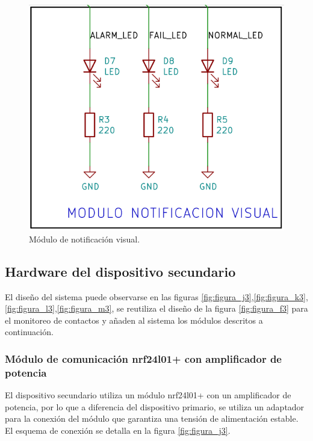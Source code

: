 \begin{figure}[]
	\centering
	\includegraphics[scale=.25]{./Figures/Capitulo3/Fig_H3.png}
	\caption{Módulo de notificación visual.}
	\label{fig:figura_h3}
\end{figure} 


\subsection{Hardware del dispositivo secundario}

El diseño del sistema puede observarse en las figuras \ref{fig:figura_j3},\ref{fig:figura_k3},\ref{fig:figura_l3},\ref{fig:figura_m3}, se reutiliza el diseño de la figura \ref{fig:figura_f3} para el monitoreo de contactos y añaden al sistema los módulos descritos a continuación.

\subsubsection{Módulo de comunicación nrf24l01+ con amplificador de potencia}

El dispositivo secundario utiliza un módulo nrf24l01+ con un amplificador de potencia, por lo que a diferencia del dispositivo primario, se utiliza un adaptador para la conexión del módulo que garantiza una tensión de alimentación estable. El esquema de conexión se detalla en la figura \ref{fig:figura_j3}.

